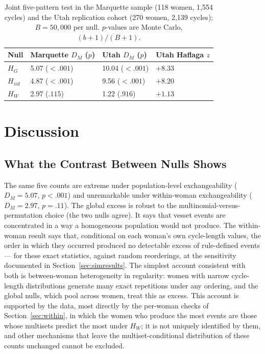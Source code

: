 \documentclass[12pt]{article}
\newcommand{\HG}{H_{G}}
\newcommand{\HI}{H_{iid}}
\newcommand{\HW}{H_{W}}
\newcommand{\DM}{D_{M}}
\begin{document}
\begin{table}[!htbp]
\centering
\caption{Joint five-pattern test in the Marquette sample (118 women, 1,554 cycles) and
  the Utah replication cohort (270 women, 2,139 cycles); $B = 50{,}000$ per null.
  $p$-values are Monte Carlo, $(b+1)/(B+1)$.}
\label{tab:ext}
\smallskip
\begin{tabular}{L{2.2cm} C{3.4cm} C{3.4cm} C{3.0cm}}
\toprule
\textbf{Null} & \textbf{Marquette} $\DM$ ($p$) & \textbf{Utah} $\DM$ ($p$) & \textbf{Utah Haflaga} $z$ \\
\midrule
$\HG$  & 5.07 ($<.001$) & 10.04 ($<.001$) & $+8.33$ \\
$\HI$  & 4.87 ($<.001$) & 9.56 ($<.001$) & $+8.20$ \\
$\HW$  & 2.97 ($.115$)  & 1.22 ($.916$)  & $+1.13$ \\
\bottomrule
\end{tabular}
\end{table}

\section{Discussion}

\subsection{What the Contrast Between Nulls Shows}

The same five counts are extreme under population-level exchangeability
($\DM = 5.07$, $p < .001$) and unremarkable under within-woman exchangeability
($\DM = 2.97$, $p = .11$). The global excess is robust to the multinomial-versus-permutation
choice (the two nulls agree). It says that vesset events are
concentrated in a way a homogeneous population would not produce. The within-woman result
says that, conditional on each woman's own cycle-length values, the order in which they
occurred produced no detectable excess of rule-defined events --- for these exact
statistics, against random reorderings, at the sensitivity documented in
Section~\ref{sec:simresults}. The simplest account consistent with both is
between-woman heterogeneity in regularity: women with narrow cycle-length distributions
generate many exact repetitions under any ordering, and the global nulls, which pool
across women, treat this as excess. This account is supported by the data, most directly
by the per-woman checks of Section~\ref{sec:within}, in which the women who produce the
most events are those whose multisets predict the most under $\HW$; it is not uniquely
identified by them, and other mechanisms that leave the multiset-conditional
distribution of these counts unchanged cannot be excluded.
\end{document}
